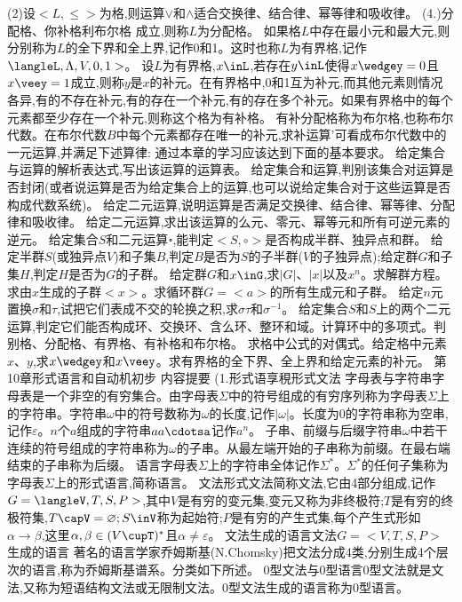 (2)设$<L,\leqslant>$为格,则运算$\vee$和$\wedge$适合交换律、结合律、幂等律和吸收律。
(4.)分配格、你补格利布尔格
成立,则称$L$为分配格。
如果格$L$中存在最小元和最大元,则分别称为$L$的全下界和全上界,记作0和1。这时也称$L$为有界格,记作$\langleL,\Lambda,V,0,1>$。
设$L$为有界格,$x\inL$,若存在$y\inL$使得$x\wedgey=0$且$x\veey=1$成立,则称$y$是$x$的补元。在有界格中,0和1互为补元,而其他元素则情况各异,有的不存在补元,有的存在一个补元,有的存在多个补元。如果有界格中的每个元素都至少存在一个补元,则称这个格为有补格。
有补分配格称为布尔格,也称布尔代数。在布尔代数$B$中每个元素都存在唯一的补元,求补运算'可看成布尔代数中的一元运算,并满足下述算律:
通过本章的学习应该达到下面的基本要求。
给定集合与运算的解析表达式,写出该运算的运算表。
给定集合和运算,判别该集合对运算是否封闭(或者说运算是否为给定集合上的运算,也可以说给定集合对于这些运算是否构成代数系统)。
给定二元运算,说明运算是否满足交换律、结合律、幂等律、分配律和吸收律。
给定二元运算,求出该运算的么元、零元、幂等元和所有可逆元素的逆元。
给定集合$S$和二元运算॰,能判定$<S,\circ>$是否构成半群、独异点和群。
给定半群$S$(或独异点$V$)和子集$B$,判定$B$是否为$S$的子半群($V$的子独异点);给定群$G$和子集$H$,判定$H$是否为$G$的子群。
给定群$G$和$x\inG$,求$|G|$、$|x|$以及$x^{n}$。求解群方程。求由$x$生成的子群$<x>$。求循环群$G=<a>$的所有生成元和子群。
给定$n$元置换$\sigma$和$\tau$,试把它们表成不交的轮换之积,求$\sigma\tau$和$\sigma^{-1}$。
给定集合$S$和$S$上的两个二元运算,判定它们能否构成环、交换环、含么环、整环和域。计算环中的多项式。判别格、分配格、有界格、有补格和布尔格。
求格中公式的对偶式。给定格中元素$x、y$,求$x\wedgey$和$x\veey$。求有界格的全下界、全上界和给定元素的补元。
{第10章形式语言和自动机初步}
{内容提要}
{(1.形式语享䅐形式文法}
字母表与字符串字母表是一个非空的有穷集合。由字母表$\Sigma$中的符号组成的有穷序列称为字母表$\Sigma$上的字符串。字符串$\omega$中的符号数称为$\omega$的长度,记作$|\omega|$。长度为0的字符串称为空串,记作$\varepsilon。n$个$a$组成的字符串$aa\cdotsa$记作$a^{n}$。
子串、前缀与后缀字符串$\omega$中若干连续的符号组成的字符串称为$\omega$的子串。从最左端开始的子串称为前缀。在最右端结束的子串称为后缀。
语言字母表$\Sigma$上的字符串全体记作$\Sigma^{*}$。$\Sigma^{*}$的任何子集称为字母表$\Sigma$上的形式语言,简称语言。
文法形式文法简称文法,它由4部分组成,记作$G=\langleV,T,S,P>$,其中$V$是有穷的变元集,变元又称为非终极符;$T$是有穷的终极符集,$T\capV=\varnothing;S\inV$称为起始符;$P$是有穷的产生式集,每个产生式形如$\alpha\rightarrow\beta$,这里$\alpha,\beta\in(V\cupT)^{*}$且$\alpha\neq\varepsilon$。
文法生成的语言文法$G=<V,T,S,P>$生成的语言
著名的语言学家乔姆斯基(N.Chomsky)把文法分成4类,分别生成4个层次的语言,称为乔姆斯基谱系。分类如下所述。
0型文法与0型语言0型文法就是文法,又称为短语结构文法或无限制文法。0型文法生成的语言称为0型语言。

